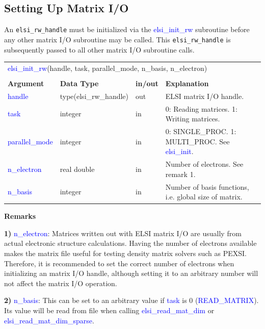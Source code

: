 \documentclass{report}
\newcommand{\tcb}[1]{\textcolor{blue}{#1}}
\begin{document}
\subsection{Setting Up Matrix I/O}
\label{subsec:rw_init}
An \texttt{elsi\_rw\_handle} must be initialized via the \tcb{elsi\_init\_rw} subroutine before any other matrix I/O subroutine may be called. This \texttt{elsi\_rw\_handle} is subsequently passed to all other matrix I/O subroutine calls.

\begin{tabular}[]{|p{20mm}|p{45mm}|p{15mm}|p{85mm}|}
\multicolumn{4}{l}{\tcb{elsi\_init\_rw}(handle, task, parallel\_mode, n\_basis, n\_electron)}\\
\multicolumn{4}{l}{}\\
\hline
\multicolumn{1}{|l|}{\textbf{Argument}} & \multicolumn{1}{l|}{\textbf{Data Type}} & \multicolumn{1}{l|}{\textbf{in/out}} & \multicolumn{1}{l|}{\textbf{Explanation}}\\
\hline
\tcb{handle}         & type(elsi\_rw\_handle) & out & ELSI matrix I/O handle.\\
\hline
\tcb{task}           & integer                & in  & 0: Reading matrices. 1: Writing matrices.\\
\hline
\tcb{parallel\_mode} & integer                & in  & 0: SINGLE\_PROC. 1: MULTI\_PROC. See \tcb{elsi\_init}.\\
\hline
\tcb{n\_electron}    & real double            & in  & Number of electrons. See remark 1.\\
\hline
\tcb{n\_basis}       & integer                & in  & Number of basis functions, i.e. global size of matrix.\\
\hline
\end{tabular}

\textbf{Remarks}

\textbf{1)} \tcb{n\_electron}: Matrices written out with ELSI matrix I/O are usually from actual electronic structure calculations. Having the number of electrons available makes the matrix file useful for testing density matrix solvers such as PEXSI. Therefore, it is recommended to set the correct number of electrons when initializing an matrix I/O handle, although setting it to an arbitrary number will not affect the matrix I/O operation.

\textbf{2)} \tcb{n\_basis}: This can be set to an arbitrary value if \tcb{task} is 0 (\tcb{READ\_MATRIX}). Its value will be read from file when calling \tcb{elsi\_read\_mat\_dim} or \tcb{elsi\_read\_mat\_dim\_sparse}.
\end{document}
